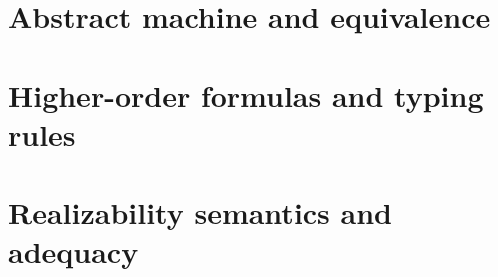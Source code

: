 \chapter{Abstract machine and equivalence}



\chapter{Higher-order formulas and typing rules}



\chapter{Realizability semantics and adequacy}


